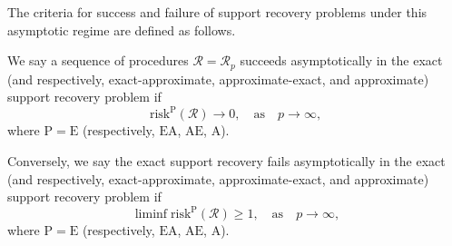 The criteria for success and failure of support recovery problems under this asymptotic regime are defined as follows.
\begin{definition} \label{def:exact-recovery-success-failure}
We say a sequence of procedures $\mathcal{R} = \mathcal{R}_p$ succeeds asymptotically in the exact (and respectively, exact-approximate, approximate-exact, and approximate) support recovery problem if 
\begin{equation} \label{eq:support-recovery-success}
    \mathrm{risk}^{\mathrm{P}}(\mathcal{R}) \to 0, \quad \text{as}\quad p\to\infty,
\end{equation}
where $\mathrm{P}=\mathrm{E}$ (respectively, $\mathrm{EA}$, $\mathrm{AE}$, $\mathrm{A}$).

Conversely, we say the exact support recovery fails asymptotically in the exact (and respectively, exact-approximate, approximate-exact, and approximate) support recovery problem if 
\begin{equation} \label{eq:support-recovery-faliure}
    \liminf\mathrm{risk}^{\mathrm{P}}(\mathcal{R}) \ge 1, \quad \text{as}\quad p\to\infty,
\end{equation}
where $\mathrm{P}=\mathrm{E}$ (respectively, $\mathrm{EA}$, $\mathrm{AE}$, $\mathrm{A}$).
\end{definition}


